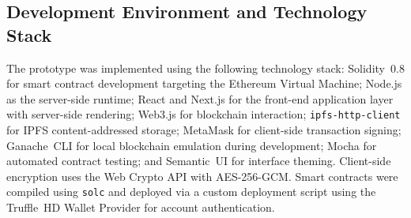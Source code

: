 \documentclass[AMA,LATO1COL]{WileyNJD-v2}
\begin{document}
%
%
%
%
%
%
%

\subsection{Development Environment and Technology Stack}\label{subsec:devenv}

The prototype was implemented using the following technology stack: Solidity~0.8 for smart contract development targeting the Ethereum Virtual Machine; Node.js as the server-side runtime; React and Next.js for the front-end application layer with server-side rendering; Web3.js for blockchain interaction; \texttt{ipfs-http-client} for IPFS content-addressed storage; MetaMask for client-side transaction signing; Ganache~CLI for local blockchain emulation during development; Mocha for automated contract testing; and Semantic~UI for interface theming. Client-side encryption uses the Web Crypto API with AES-256-GCM. Smart contracts were compiled using \texttt{solc} and deployed via a custom deployment script using the Truffle~HD Wallet Provider for account authentication.
\end{document}
